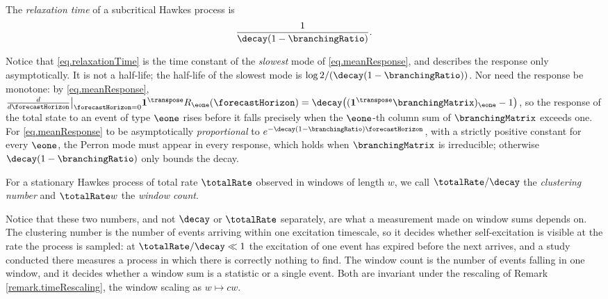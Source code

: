 \begin{defi}\label{def.relaxationTime}
 The \emph{relaxation time} of a subcritical Hawkes process is
 \begin{equation}\label{eq.relaxationTime}
  \frac{1}{\decay(1-\branchingRatio)} .
 \end{equation}
\end{defi}


\begin{remark}
 Notice that \eqref{eq.relaxationTime} is the time constant of the \emph{slowest} mode of
 \eqref{eq.meanResponse}, and describes the response only asymptotically.
 It is not a half-life; the half-life of the slowest mode is
 $\log 2 / (\decay(1-\branchingRatio))$.
 Nor need the response be monotone: by \eqref{eq.meanResponse},
 $\frac{d}{d\forecastHorizon}\big\vert_{\forecastHorizon=0}
 \mathbf{1}^{\transpose}R_{\eone}(\forecastHorizon)
 = \decay\big( (\mathbf{1}^{\transpose}\branchingMatrix)_{\eone} - 1 \big)$,
 so the response of the total state to an event of type $\eone$ rises before it falls
 precisely when the $\eone$-th column sum of $\branchingMatrix$ exceeds one.
 For \eqref{eq.meanResponse} to be asymptotically \emph{proportional} to
 $e^{-\decay(1-\branchingRatio)\forecastHorizon}$,
 with a strictly positive constant for every $\eone$,
 the Perron mode must appear in every response, which holds when $\branchingMatrix$ is
 irreducible; otherwise $\decay(1-\branchingRatio)$ only bounds the decay.
\end{remark}

\begin{defi}\label{def.dimensionlessGroups}
 For a stationary Hawkes process of total rate $\totalRate$ observed in windows of
 length $w$, we call $\totalRate/\decay$ the \emph{clustering number}
 and $\totalRate w$ the \emph{window count}.
\end{defi}

\begin{remark}\label{remark.dimensionlessGroups}
 Notice that these two numbers, and not $\decay$ or $\totalRate$ separately, are what a
 measurement made on window sums depends on.
 The clustering number is the number of events arriving within one excitation timescale,
 so it decides whether self-excitation is visible at the rate the process is sampled:
 at $\totalRate/\decay \ll 1$ the excitation of one event has expired before the next
 arrives, and a study conducted there measures a process in which there is correctly
 nothing to find.
 The window count is the number of events falling in one window,
 and it decides whether a window sum is a statistic or a single event.
 Both are invariant under the rescaling of Remark \ref{remark.timeRescaling},
 the window scaling as $w \mapsto cw$.
\end{remark}


